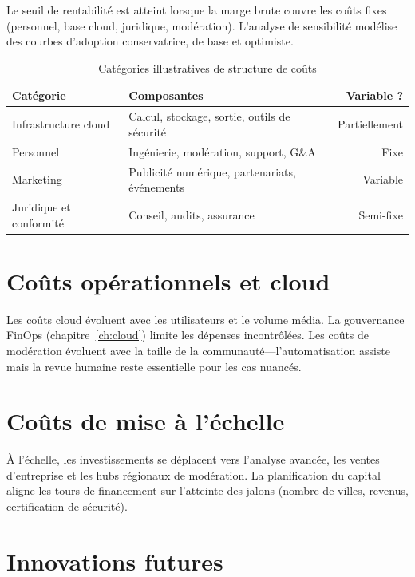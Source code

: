 Le seuil de rentabilité est atteint lorsque la marge brute couvre les coûts fixes (personnel, base cloud, juridique, modération). L'analyse de sensibilité modélise des courbes d'adoption conservatrice, de base et optimiste.

\begin{table}[H]
  \centering
  \caption{Catégories illustratives de structure de coûts}
  \label{tab:cost-structure}
  \begin{tabularx}{\textwidth}{@{}lXr@{}}
    \toprule
    \textbf{Catégorie} & \textbf{Composantes} & \textbf{Variable ?} \\
    \midrule
    Infrastructure cloud & Calcul, stockage, sortie, outils de sécurité & Partiellement \\
    Personnel & Ingénierie, modération, support, G\&A & Fixe \\
    Marketing & Publicité numérique, partenariats, événements & Variable \\
    Juridique et conformité & Conseil, audits, assurance & Semi-fixe \\
    \bottomrule
  \end{tabularx}
\end{table}

\section{Coûts opérationnels et cloud}

Les coûts cloud évoluent avec les utilisateurs et le volume média. La gouvernance FinOps (chapitre~\ref{ch:cloud}) limite les dépenses incontrôlées. Les coûts de modération évoluent avec la taille de la communauté---l'automatisation assiste mais la revue humaine reste essentielle pour les cas nuancés.

\section{Coûts de mise à l'échelle}

À l'échelle, les investissements se déplacent vers l'analyse avancée, les ventes d'entreprise et les hubs régionaux de modération. La planification du capital aligne les tours de financement sur l'atteinte des jalons (nombre de villes, revenus, certification de sécurité).

\section{Innovations futures}

